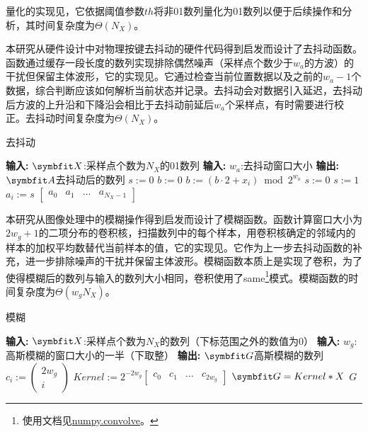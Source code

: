 {	量化的实现见，它依据阈值参数$th$将非01数列量化为01数列以便于后续操作和分析，其时间复杂度为$\Theta(N_X)$。
	
	本研究从硬件设计中对物理按键去抖动的硬件代码得到启发而设计了去抖动函数。函数通过缓存一段长度的数列实现排除偶然噪声（采样点个数少于$w_a$的方波）的干扰但保留主体波形，它的实现见。它通过检查当前位置数据以及之前的$w_a-1$个数据，综合判断应该如何解析当前状态并记录。去抖动会对数据引入延迟，去抖动后方波的上升沿和下降沿会相比于去抖动前延后$w_a$个采样点，有时需要进行校正。去抖动时间复杂度为$\Theta(N_X)$。
	
	\begin{algorithm}[!h]
		\caption{去抖动}\label{alg:antijitter}
		\begin{algorithmic}[1]
			\Statex \textbf{输入:} $\Vector X$:采样点个数为$N_X$的01数列
			\Statex \textbf{输入:} $w_a$:去抖动窗口大小
			\Statex \textbf{输出:} $\Vector A$去抖动后的数列
			\State $s:=0$
			\State $b:=0$
			\State $b:=(b\cdot2+x_i)\bmod 2^{w_a}$
			\State $s:=0$
			\State $s:=1$
			\EndIf
			\State $a_i:=s$
			\EndFor
			\State \Return $\begin{bmatrix}a_0&a_1&\ldots&a_{N_X-1}\end{bmatrix}$
		\end{algorithmic}
	\end{algorithm}
	
	本研究从图像处理中的模糊操作得到启发而设计了模糊函数。函数计算窗口大小为$2w_g+1$的二项分布的卷积核，扫描数列中的每个样本，用卷积核确定的邻域内的样本的加权平均数替代当前样本的值，它的实现见。它作为上一步去抖动函数的补充，进一步排除噪声的干扰并保留主体波形。模糊函数本质上是实现了卷积，为了使得模糊后的数列与输入的数列大小相同，卷积使用了same\footnote{使用文档见\href{https://numpy.org/doc/stable/reference/generated/numpy.convolve.html}{numpy.convolve}。}模式。模糊函数的时间复杂度为$\Theta(w_gN_X)$。
	
	\begin{algorithm}[!h]
		\caption{模糊}\label{alg:gaussblur}
		\begin{algorithmic}[1]
			\Statex \textbf{输入:} $\Vector X$:采样点个数为$N_X$的数列（下标范围之外的数值为0）
			\Statex \textbf{输入:} $w_g$:高斯模糊的窗口大小的一半（下取整）
			\Statex \textbf{输出:} $\Vector G$高斯模糊的数列
			\State $c_i:=\begin{pmatrix}
			2w_g\\
			i
			\end{pmatrix}$
			\EndFor
			\State $Kernel:=2^{-2w_g}\begin{bmatrix}c_0&c_1&\ldots&c_{2w_g}\end{bmatrix}$
			\State $\Vector G=Kernel*X$
			\State \Return $G$%
		\end{algorithmic}
	\end{algorithm}
	

}
